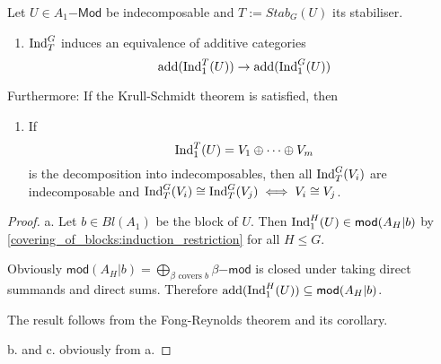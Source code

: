 
\begin{theorem}
Let $U\in A_1\mathsf{-Mod}$ be indecomposable and $T:=Stab_ G(U)$ its stabiliser.

\begin{enumerate}
\item $\operatorname{Ind}_T^ G$ induces an equivalence of additive categories
\[\operatorname{add}(\operatorname{Ind}_1^T(U)) \to \operatorname{add}(\operatorname{Ind}_1^G(U))\]
\end{enumerate}

Furthermore: If the Krull-Schmidt theorem is satisfied, then
\begin{enumerate}[resume]
\item If 
\[\operatorname{Ind}_1^T(U)=V_1 \oplus \cdots \oplus V_m\]
is the decomposition into indecomposables, then all $\operatorname{Ind}_T^G(V_i)$ are indecomposable and $\operatorname{Ind}_T^G(V_i) \cong \operatorname{Ind}_T^G(V_j) \iff V_i \cong V_j$.
\end{enumerate}
\end{theorem}
\begin{proof}
a. Let $b\in Bl(A_1)$ be the block of $U$. Then $\operatorname{Ind}_1^H(U) \in \mathsf{mod}(A_H|b)$ by \ref{covering_of_blocks:induction_restriction} for all $H\leq G$.

Obviously $\mathsf{mod}(A_H|b) = \bigoplus_{\beta\text{ covers }b} \beta\mathsf{-mod}$ is closed under taking direct summands and direct sums. Therefore $\operatorname{add}(\operatorname{Ind}_1^H(U)) \subseteq \mathsf{mod}(A_H|b)$.

The result follows from the Fong-Reynolds theorem and its corollary.

b. and c. obviously from a.
\end{proof}
